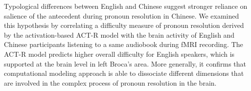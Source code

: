 Typological differences between English and Chinese suggest stronger reliance on salience of the antecedent during pronoun resolution in Chinese. We examined this hypothesis by correlating a difficulty measure of pronoun resolution derived by the activation-based ACT-R model with the brain activity of English and Chinese participants listening to a same audiobook during fMRI recording. The ACT-R model predicts higher overall difficulty for English speakers, which is supported at the brain level in left Broca's area. More generally, it confirms that computational modeling approach is able to dissociate different dimensions that are involved in the complex process of pronoun resolution in the brain.
